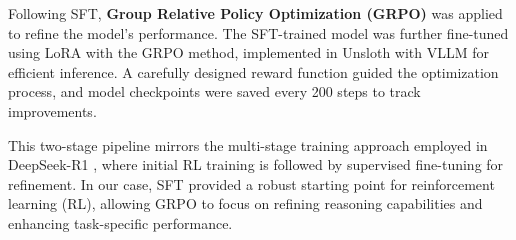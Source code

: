 Following SFT, \textbf{Group Relative Policy Optimization (GRPO)} was applied to refine the model’s performance. The SFT-trained model was further fine-tuned using LoRA \cite{hu2021loralowrankadaptationlarge} with the GRPO method, implemented in Unsloth \cite{unsloth} with VLLM \cite{kwon2023efficient} for efficient inference. A carefully designed reward function guided the optimization process, and model checkpoints were saved every 200 steps to track improvements.  

This two-stage pipeline mirrors the multi-stage training approach employed in DeepSeek-R1 \citep{Guo2025DeepSeekR1}, where initial RL training is followed by supervised fine-tuning for refinement. In our case, SFT provided a robust starting point for reinforcement learning (RL), allowing GRPO to focus on refining reasoning capabilities and enhancing task-specific performance.
